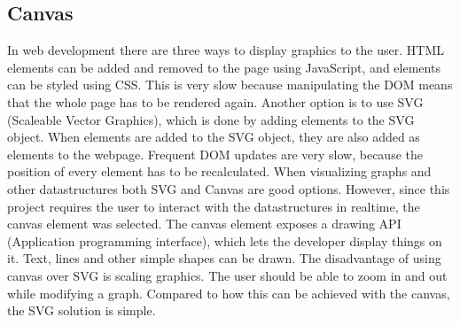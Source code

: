 \subsection{Canvas}
In web development there are three ways to display graphics to the user. HTML elements can be added and removed to the page using JavaScript, and elements can be styled using CSS. This is very slow because manipulating the DOM means that the whole page has to be rendered again. Another option is to use SVG (Scaleable Vector Graphics), which is done by adding elements to the SVG object. When elements are added to the SVG object, they are also added as elements to the webpage. Frequent DOM updates are very slow, because the position of every element has to be recalculated. When visualizing graphs and other datastructures both SVG and Canvas are good options. However, since this project requires the user to interact with the datastructures in realtime, the canvas element was selected. The canvas element exposes a drawing API (Application programming interface), which lets the developer display things on it. Text, lines and other simple shapes can be drawn. The disadvantage of using canvas over SVG is scaling graphics. The user should be able to zoom in and out while modifying a graph. Compared to how this can be achieved with the canvas, the SVG solution is simple.